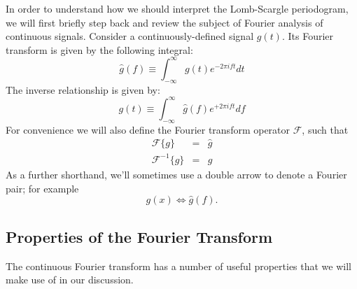 \documentclass[preprint]{aastex}
\newcommand{\eqlabel}[1]{\label{eq:#1}}
\begin{document}
In order to understand how we should interpret the Lomb-Scargle periodogram, we will first briefly step back and review the subject of Fourier analysis of continuous signals.
Consider a continuously-defined signal $g(t)$.
Its Fourier transform is given by the following integral:
\begin{equation}
    \hat{g}(f) \equiv \int_{-\infty}^\infty g(t) e^{-2\pi i f t} dt
    \eqlabel{FT-def}
\end{equation}
The inverse relationship is given by:
\begin{equation}
    g(t) \equiv \int_{-\infty}^\infty \hat{g}(f) e^{+2\pi i f t} df
    \eqlabel{IFT-def}
\end{equation}
For convenience we will also define the Fourier transform operator
$\mathcal{F}$, such that
\begin{eqnarray}
    \mathcal{F}\{g\} &=& \hat{g} \\
    \mathcal{F}^{-1}\{\hat{g}\} &=& g
\end{eqnarray}
As a further shorthand, we'll sometimes use a double arrow to denote a Fourier
pair; for example
\begin{equation}
  g(x) \Longleftrightarrow \hat{g}(f).
\end{equation}

\subsection{Properties of the Fourier Transform}

The continuous Fourier transform has a number of useful properties that we will make use of in our discussion.
\end{document}
